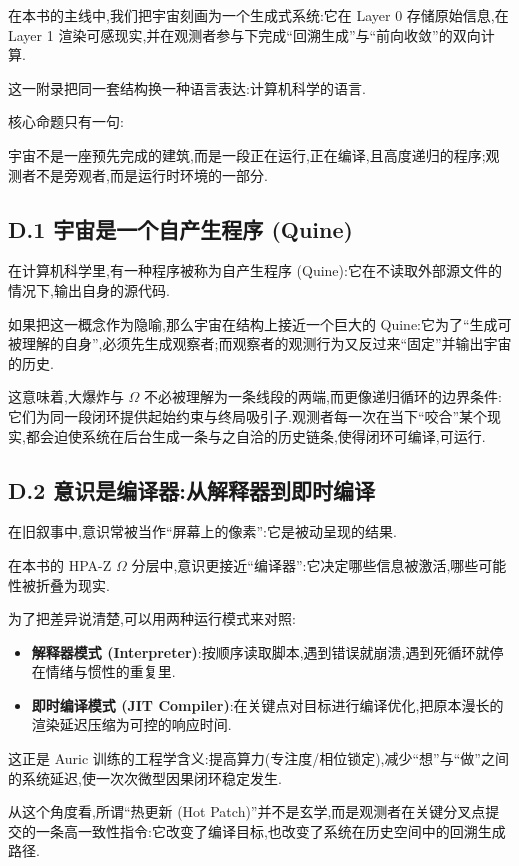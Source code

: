 在本书的主线中,我们把宇宙刻画为一个生成式系统:它在 Layer 0 存储原始信息,在 Layer 1 渲染可感现实,并在观测者参与下完成``回溯生成''与``前向收敛''的双向计算.

这一附录把同一套结构换一种语言表达:计算机科学的语言.

核心命题只有一句:

宇宙不是一座预先完成的建筑,而是一段正在运行,正在编译,且高度递归的程序;观测者不是旁观者,而是运行时环境的一部分.

\subsection*{D.1 宇宙是一个自产生程序 (Quine)}

在计算机科学里,有一种程序被称为自产生程序 (Quine):它在不读取外部源文件的情况下,输出自身的源代码.

如果把这一概念作为隐喻,那么宇宙在结构上接近一个巨大的 Quine:它为了``生成可被理解的自身'',必须先生成观察者;而观察者的观测行为又反过来``固定''并输出宇宙的历史.

这意味着,大爆炸与 $\Omega$ 不必被理解为一条线段的两端,而更像递归循环的边界条件:它们为同一段闭环提供起始约束与终局吸引子.观测者每一次在当下``咬合''某个现实,都会迫使系统在后台生成一条与之自洽的历史链条,使得闭环可编译,可运行.

\subsection*{D.2 意识是编译器:从解释器到即时编译}

在旧叙事中,意识常被当作``屏幕上的像素'':它是被动呈现的结果.

在本书的 HPA-Z $\Omega$ 分层中,意识更接近``编译器'':它决定哪些信息被激活,哪些可能性被折叠为现实.

为了把差异说清楚,可以用两种运行模式来对照:

\begin{itemize}
\item \textbf{解释器模式 (Interpreter)}:按顺序读取脚本,遇到错误就崩溃,遇到死循环就停在情绪与惯性的重复里.
\item \textbf{即时编译模式 (JIT Compiler)}:在关键点对目标进行编译优化,把原本漫长的渲染延迟压缩为可控的响应时间.
\end{itemize}

这正是 Auric 训练的工程学含义:提高算力(专注度/相位锁定),减少``想''与``做''之间的系统延迟,使一次次微型因果闭环稳定发生.

从这个角度看,所谓``热更新 (Hot Patch)''并不是玄学,而是观测者在关键分叉点提交的一条高一致性指令:它改变了编译目标,也改变了系统在历史空间中的回溯生成路径.

